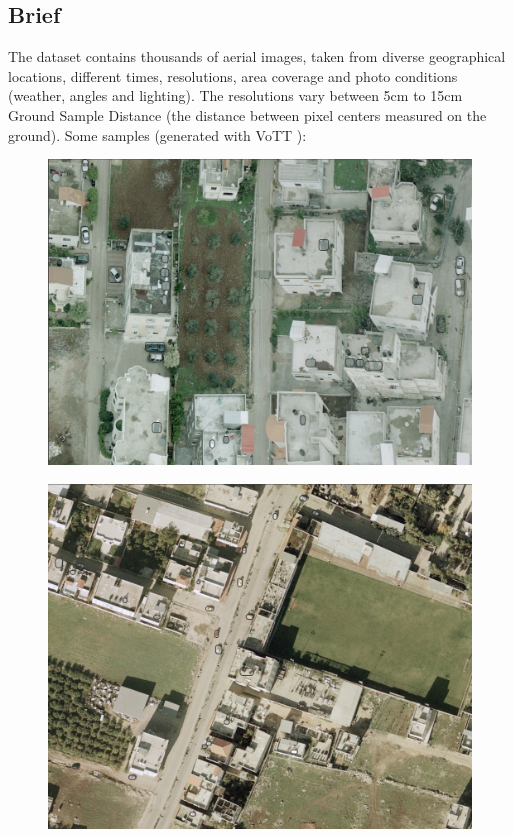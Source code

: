 \documentclass[]{article}
\begin{document}
\subsection{Brief}
The dataset contains thousands of aerial images, taken from diverse geographical locations, different times, resolutions, area coverage and photo conditions (weather, angles and lighting). The resolutions vary between 5cm to 15cm Ground Sample Distance (the distance between pixel centers measured on the ground). Some samples (generated with VoTT \cite{vott}):\\
\begin{figure}[!h]
\centering
\includegraphics[width=1\linewidth]{"images/im1"}
\end{figure}
\begin{figure}[!h]
\centering
\includegraphics[width=1\linewidth]{"images/im2"}
\end{figure}
\end{document}
